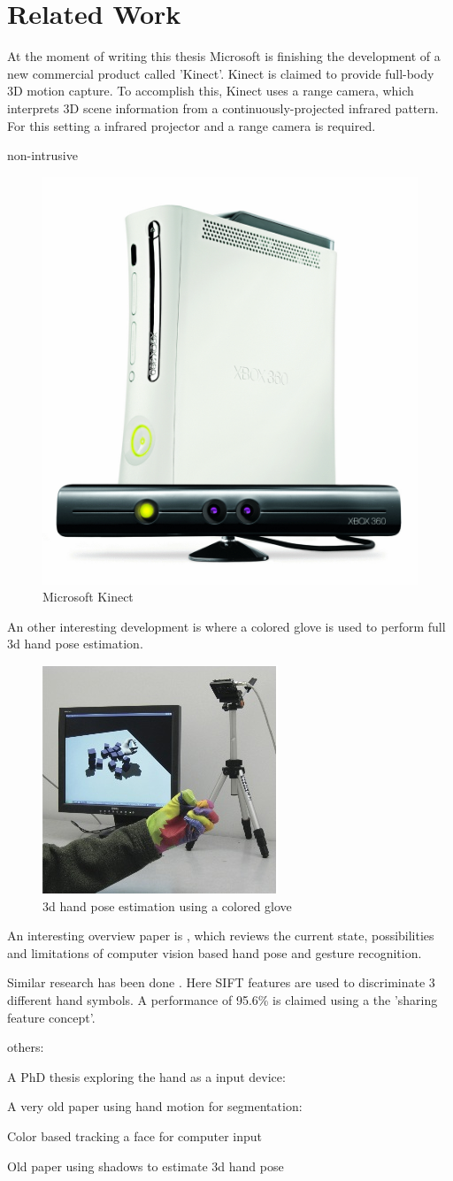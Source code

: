 \section{Related Work}
At the moment of writing this thesis Microsoft is finishing the development of a new commercial product called 'Kinect'. Kinect is claimed to provide full-body 3D motion capture. To accomplish this, Kinect uses a range camera, which interprets 3D scene information from a continuously-projected infrared pattern. For this setting a infrared projector and a range camera is required.

non-intrusive

\begin{figure}[htbp]
	\center{}
	\label{fig:kinect}
	\includegraphics[width=0.3\linewidth]{figures/wave.jpg}
	\caption{Microsoft Kinect}
\end{figure}


An other interesting development is \cite{Wang2009} where a colored glove is used to perform full 3d hand pose estimation.

\begin{figure}[htbp]
	\center{}
	\label{fig:wang2009}
	\includegraphics[width=0.3\linewidth]{figures/wang2009.jpg}
	\caption{3d hand pose estimation using a colored glove}
\end{figure}

An interesting overview paper is \cite{Erol2007}, which reviews the current state, possibilities and limitations of computer vision based hand pose and gesture recognition.


Similar research has been done \cite{Wang2007}. Here SIFT features are used to discriminate 3 different hand symbols. A performance of 95.6\% is claimed using a the 'sharing feature concept'.





others:

A PhD thesis exploring the hand as a input device: \cite{Sturman1992}

A very old paper using hand motion for segmentation: \cite{Cui1996}

Color based tracking a face for computer input \cite{Bradski1998}

Old paper using shadows to estimate 3d hand pose \cite{Segen1999}



